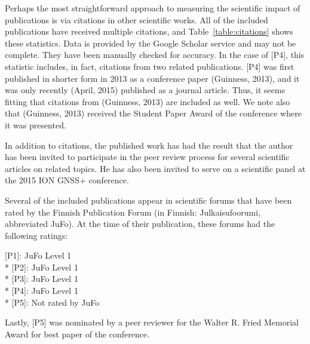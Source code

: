 Perhaps the most straightforward approach to measuring the scientific impact of publications is via citations in other scientific works. All of the included publications have received multiple citations, and Table~\ref{table:citations} shows these statistics. Data is provided by the Google Scholar service and may not be complete. They have been manually checked for accuracy. In the case of [P4], this statistic includes, in fact, citations from two related publications. [P4] was first published in shorter form in 2013 as a conference paper (Guinness, 2013), and it was only recently (April, 2015) published as a journal article. Thus, it seems fitting that citations from (Guinness, 2013) are included as well. We note also that (Guinness, 2013) received the Student Paper Award of the conference where it was presented.

In addition to citations, the published work has had the result that the author has been invited to participate in the peer review process for several scientific articles on related topics. He has also been invited to serve on a scientific panel at the 2015 ION GNSS+ conference.

Several of the included publications appear in scientific forums that have been rated by the Finnish Publication Forum (in Finnish: Julkaisufoorumi, abbreviated JuFo). At the time of their publication, these forums had the following ratings:

[P1]: JuFo Level 1 \\*
{[P2]}: JuFo Level 1 \\*
{[P3]}: JuFo Level 1 \\*
{[P4]}: JuFo Level 1 \\*
{[P5]}: Not rated by JuFo

Lastly, [P5] was nominated by a peer reviewer for the Walter R. Fried Memorial Award for best paper of the conference.



